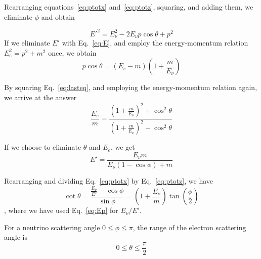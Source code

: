 \documentclass{beamer}
\begin{document}
\begin{frame}[allowframebreaks]{}
Rearranging equations~\eqref{eq:ptotx} and~\eqref{eq:ptotz}, squaring, and adding them, we eliminate $\phi$ and obtain

\begin{equation}
  E'^2 = E^2_\nu -2E_\nu p\cos\theta+p^2
\end{equation}
If we eliminate $E'$ with Eq.~\eqref{eq:E}, and employ the energy-momentum relation $E_e^2=p^2+m^2$ once, we obtain
\begin{equation} \label{eq:lasteq}
  p\cos\theta=(E_e-m)\left( 1+\frac{m}{E_\nu} \right)
\end{equation}

\framebreak

By squaring Eq.~\eqref{eq:lasteq}, and employing the energy-momentum relation again, we arrive at the answer
\begin{equation} \label{eq:Ee}
  \boxed{\frac{E_e}{m}=\frac{\left( 1+\frac{m}{E_\nu} \right)^2+\cos^2\theta}{\left( 1+\frac{m}{E_\nu} \right)^2-\cos^2\theta}}
\end{equation}

If we choose to eliminate $\theta$ and $E_e$, we get
\begin{equation} \label{eq:Ep}
  E'=\frac{E_\nu m}{E_\nu(1-\cos\phi)+m}
\end{equation}

\framebreak

Rearranging and dividing Eq.~\eqref{eq:ptotx} by Eq.~\eqref{eq:ptotz}, we have
\begin{equation}
  \cot\theta=\frac{\frac{E_\nu}{E'}-\cos\phi}{\sin\phi}=\left( 1+\frac{E_\nu}{m} \right)\tan\left( \frac{\phi}{2} \right)
\end{equation}
, where we have used Eq.~\eqref{eq:Ep} for $E_\nu/E'$.

For a neutrino scattering angle $0\leq\phi\leq\pi$, the range of the electron scattering angle is
\begin{equation}
  \boxed{0\leq\theta\leq\frac{\pi}{2}}
\end{equation}
\end{frame}
\end{document}

